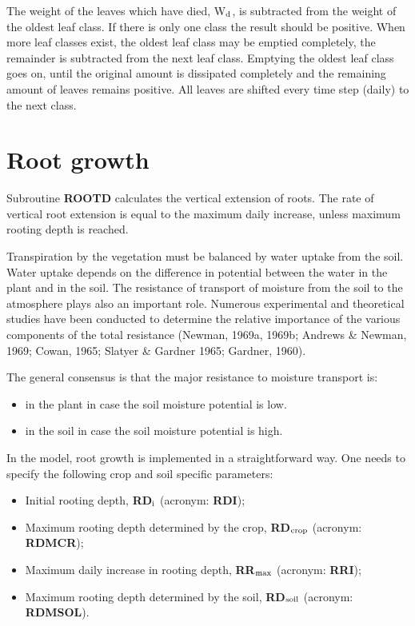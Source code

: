 The weight of the leaves which have died, W$_{{\rm d}}$, is subtracted from the weight of the oldest
leaf class. If there is only one class the result should be positive. When more leaf classes
exist, the oldest leaf class may be emptied completely, the remainder is subtracted from
the next leaf class. Emptying the oldest leaf class goes on, until the original amount is
dissipated completely and the remaining amount of leaves remains positive. All leaves are
shifted every time step (daily) to the next class.

\section{Root growth}

Subroutine {\bf ROOTD} calculates the vertical extension of roots. The rate of vertical root
extension is equal to the maximum daily increase, unless maximum rooting depth is
reached.

Transpiration by the vegetation must be balanced by water uptake from the soil. Water
uptake depends on the difference in potential between the water in the plant and in the
soil. The resistance of transport of moisture from the soil to the atmosphere plays also an
important role. Numerous experimental and theoretical studies have been conducted to
determine the relative importance of the various components of the total resistance
(Newman, 1969a, 1969b; Andrews \& Newman, 1969; Cowan, 1965; Slatyer \& Gardner
1965; Gardner, 1960).

The general consensus is that the major resistance to moisture transport is:
\begin{itemize}
\item in the plant in case the soil moisture potential is low.
\item in the soil in case the soil moisture potential is high.
\end{itemize}

In the model, root growth is implemented in a straightforward way. One needs to specify
the following crop and soil specific parameters:
\begin{itemize}
\item Initial rooting depth, {\bf RD$_{{\rm i}}$} (acronym: {\bf RDI});
\item Maximum rooting depth determined by the crop, {\bf RD$_{{\rm crop}}$} (acronym: {\bf RDMCR});
\item Maximum daily increase in rooting depth, {\bf RR$_{{\rm max}}$} (acronym: {\bf RRI});
\item Maximum rooting depth determined by the soil, {\bf RD$_{{\rm soil}}$} (acronym: {\bf RDMSOL}).
\end{itemize}

